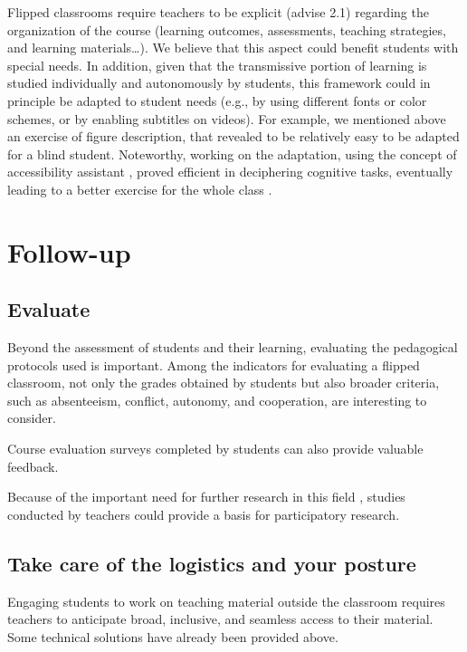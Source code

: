 \documentclass[10pt,letterpaper]{article}
\begin{document}
Flipped classrooms require teachers to be explicit (advise 2.1) regarding the organization of the course (learning outcomes, assessments, teaching strategies, and learning materials\ldots). We believe that this aspect could benefit students with special needs. 
In addition, given that the transmissive portion of learning is studied individually and autonomously by students, this framework could in principle be adapted to student needs (e.g., by using different fonts or color schemes, or by enabling subtitles on videos).
For example, we mentioned above an exercise of figure description, that revealed to be relatively easy to be adapted for a blind student. Noteworthy, working on the adaptation, using the concept of accessibility assistant \cite{minkara2015implementation}, proved efficient in deciphering cognitive tasks, eventually leading to a better exercise for the whole class \cite{uzan_gerard_2021_6565239}.

\section{Follow-up}

\subsection{Evaluate}
Beyond the assessment of students and their learning, evaluating the pedagogical protocols used is important. 
Among the indicators for evaluating a flipped classroom, not only the grades obtained by students but also broader criteria, such as absenteeism, conflict, autonomy, and cooperation, are interesting to consider.

Course evaluation surveys completed by students can also provide valuable feedback.

Because of the important need for further research in this field \cite{abeysekera_motivation_2015,bishop_flipped_2013,lo_critical_2017}, studies conducted by teachers could provide a basis for participatory research.




\subsection{Take care of the logistics and your posture}

Engaging students to work on teaching material outside the classroom requires teachers to anticipate broad, inclusive, and seamless access to their material. Some technical solutions have already been provided above.
\end{document}

